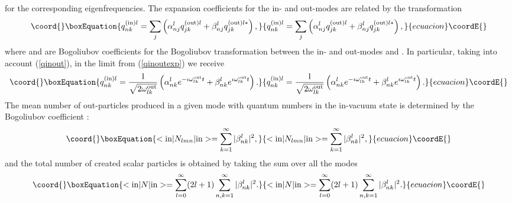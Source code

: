 \documentclass[a4paper,11pt]{article}
\begin{document}
for the corresponding eigenfrequencies. The expansion coefficients for the
in- and out-modes are related by the transformation \cite{set}
\begin{equation}\coord{}\boxEquation{
q_{nk}^{{\mathrm{(in)}}l}=\sum_{j}\left( \alpha _{nj}^{l}
q_{jk}^{{\mathrm{(out)}}
l}+\beta _{nj}^{l}q_{jk}^{{\mathrm{(out)}}l\ast }\right) ,  \label{qinoutexp}
}{
q_{nk}^{{\mathrm{(in)}}l}=\sum_{j}\left( \alpha _{nj}^{l}
q_{jk}^{{\mathrm{(out)}}
l}+\beta _{nj}^{l}q_{jk}^{{\mathrm{(out)}}l\ast }\right) ,  }{ecuacion}\coordE{}\end{equation}
where \coordHE{} and \coordHE{} are Bogoliubov coefficients
for the Bogoliubov transformation between the in- and out-modes \coordHE{} and \coordHE{}. In
particular, taking into account (\ref{qinout}), in the limit \coordHE{} from (\ref{qinoutexp}) we receive
\begin{equation}\coord{}\boxEquation{
q_{nk}^{{\mathrm{(in)}}l}=\frac{1}{\sqrt{2\omega _{lk}^{{\mathrm{out}}}}}
\left(
\alpha _{nk}^{l}e^{-\imath \omega _{lk}^{{\mathrm{out}}}t}+\beta
_{nk}^{l}e^{\imath \omega _{lk}^{{\mathrm{out}}}t}\right) .  \label{qinoutas}
}{
q_{nk}^{{\mathrm{(in)}}l}=\frac{1}{\sqrt{2\omega _{lk}^{{\mathrm{out}}}}}
\left(
\alpha _{nk}^{l}e^{-\imath \omega _{lk}^{{\mathrm{out}}}t}+\beta
_{nk}^{l}e^{\imath \omega _{lk}^{{\mathrm{out}}}t}\right) .  }{ecuacion}\coordE{}\end{equation}
The mean number of out-particles produced in a given mode with
quantum numbers \coordHE{} in the
in-vacuum state is determined by the Bogoliubov coefficient \coordHE{}%
:
\begin{equation}\coord{}\boxEquation{
<{\mathrm{in}}|N_{lmn}|{\mathrm{in}}>=\sum_{k=1}^{\infty }|
\beta _{nk}^{l}|^{2},
\label{Nlmn}
}{
<{\mathrm{in}}|N_{lmn}|{\mathrm{in}}>=\sum_{k=1}^{\infty }|
\beta _{nk}^{l}|^{2},
}{ecuacion}\coordE{}\end{equation}
and the total number of created scalar particles is obtained by
taking the sum over all the modes
\begin{equation}\coord{}\boxEquation{
<{\mathrm{in}}|N|{\mathrm{in}}>=\sum_{l=0}^{\infty }(2l+1)
\sum_{n,k=1}^{\infty
}|\beta _{nk}^{l}|^{2}.  \label{Ntot}
}{
<{\mathrm{in}}|N|{\mathrm{in}}>=\sum_{l=0}^{\infty }(2l+1)
\sum_{n,k=1}^{\infty
}|\beta _{nk}^{l}|^{2}.  }{ecuacion}\coordE{}\end{equation}
\end{document}
